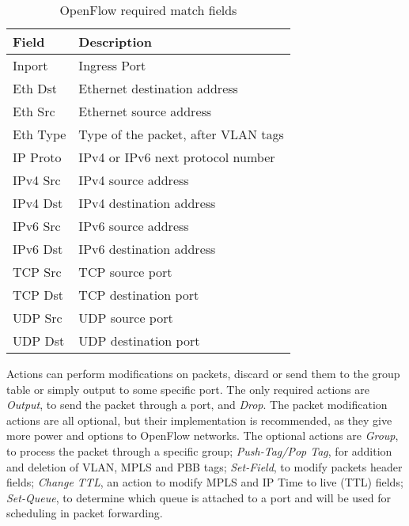 \begin{table}[H]
\caption{OpenFlow required match fields}\label{tab:OFRequired}
\centering
\begin{tabular}{|l|l|}
\hline
\textbf{Field} & \textbf{Description}                \\ \hline
Inport         & Ingress Port                        \\ \hline
Eth Dst        & Ethernet destination address         \\ \hline
Eth Src        & Ethernet source address              \\ \hline
Eth Type       & Type of the packet, after VLAN tags \\ \hline
IP Proto       & IPv4 or IPv6 next protocol number   \\ \hline
IPv4 Src       & IPv4 source address                 \\ \hline
IPv4 Dst       & IPv4 destination address             \\ \hline
IPv6 Src       & IPv6 source address                 \\ \hline
IPv6 Dst       & IPv6 destination address            \\ \hline
TCP Src        & TCP source port                     \\ \hline
TCP Dst        & TCP destination port                \\ \hline
UDP Src        & UDP source port                     \\ \hline
UDP Dst        & UDP destination port                \\ \hline
\end{tabular}
\label{my-label}
\end{table}

Actions can perform modifications on packets, discard or send them to the group table or simply output to some specific port. The only required actions are \textit{Output}, to send the packet through a port, and \textit{Drop}. The packet modification actions are all optional, but their implementation is recommended, as they give more power and options to OpenFlow networks. The optional actions are \textit{Group}, to process the packet through a specific group; \textit{Push-Tag/Pop Tag}, for addition and deletion of VLAN, MPLS and PBB tags; \textit{Set-Field}, to modify packets header fields; \textit{Change TTL}, an action to modify MPLS and IP Time to live (TTL) fields; \textit{Set-Queue}, to determine which queue is attached to a port and will be used for scheduling in packet forwarding.

